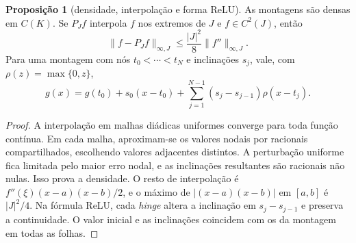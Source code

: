 \documentclass[12pt,a4paper]{article}
\theoremstyle{preciso}
\theoremstyle{definition}
\theoremstyle{preciso}
\theoremstyle{preciso}
\theoremstyle{preciso}
\newtheorem{proposition}[teorema]{Proposição}
\theoremstyle{preciso}
\theoremstyle{definition}
\theoremstyle{preciso}
\theoremstyle{definition}
\theoremstyle{preciso}
\theoremstyle{preciso}
\theoremstyle{definition}
\begin{document}
\begin{proposition}[densidade, interpolação e forma ReLU]\label{map:artigo_2:2.3}\label{artigo_2:prop:preliminary-facts}
As montagens são densas em $C(K)$. Se $P_Jf$ interpola $f$ nos extremos de $J$ e $f\in C^2(J)$, então
\begin{equation}
 \|f-P_Jf\|_{\infty,J}\le\frac{|J|^2}{8}\|f''\|_{\infty,J}.
 \label{artigo_2:eq:interpolation-remainder}
\end{equation}
Para uma montagem com nós $t_0<\cdots<t_N$ e inclinações $s_j$, vale, com $\rho(z)=\max\{0,z\}$,
\begin{equation}
 g(x)=g(t_0)+s_0(x-t_0)+\sum_{j=1}^{N-1}(s_j-s_{j-1})\rho(x-t_j).
 \label{artigo_2:eq:assembly-relu}
\end{equation}
\end{proposition}
\begin{proof}
A interpolação em malhas diádicas uniformes converge para toda função contínua. Em cada malha, aproximam-se os valores nodais por racionais compartilhados, escolhendo valores adjacentes distintos. A perturbação uniforme fica limitada pelo maior erro nodal, e as inclinações resultantes são racionais não nulas. Isso prova a densidade. O resto de interpolação é $f''(\xi)(x-a)(x-b)/2$, e o máximo de $|(x-a)(x-b)|$ em $[a,b]$ é $|J|^2/4$. Na fórmula ReLU, cada \emph{hinge} altera a inclinação em $s_j-s_{j-1}$ e preserva a continuidade. O valor inicial e as inclinações coincidem com os da montagem em todas as folhas.
\end{proof}
\end{document}
